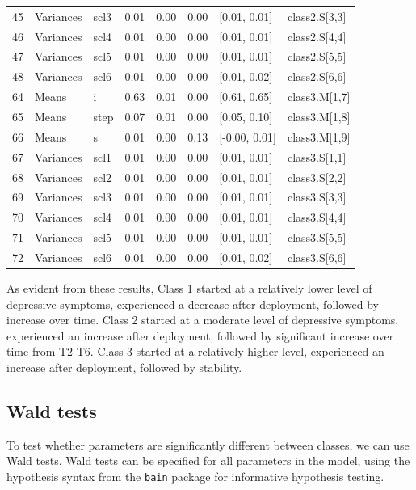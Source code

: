 \documentclass[
  man,floatsintext]{apa6}
\begin{document}
\begin{center}
\begin{ThreePartTable}
\begin{longtable}{llllllll}
45 & Variances & scl3 & 0.01 & 0.00 & 0.00 & {}[0.01, 0.01] & class2.S[3,3]\\
46 & Variances & scl4 & 0.01 & 0.00 & 0.00 & {}[0.01, 0.01] & class2.S[4,4]\\
47 & Variances & scl5 & 0.01 & 0.00 & 0.00 & {}[0.01, 0.01] & class2.S[5,5]\\
48 & Variances & scl6 & 0.01 & 0.00 & 0.00 & {}[0.01, 0.02] & class2.S[6,6]\\
64 & Means & i & 0.63 & 0.01 & 0.00 & {}[0.61, 0.65] & class3.M[1,7]\\
65 & Means & step & 0.07 & 0.01 & 0.00 & {}[0.05, 0.10] & class3.M[1,8]\\
66 & Means & s & 0.01 & 0.00 & 0.13 & {}[-0.00, 0.01] & class3.M[1,9]\\
67 & Variances & scl1 & 0.01 & 0.00 & 0.00 & {}[0.01, 0.01] & class3.S[1,1]\\
68 & Variances & scl2 & 0.01 & 0.00 & 0.00 & {}[0.01, 0.01] & class3.S[2,2]\\
69 & Variances & scl3 & 0.01 & 0.00 & 0.00 & {}[0.01, 0.01] & class3.S[3,3]\\
70 & Variances & scl4 & 0.01 & 0.00 & 0.00 & {}[0.01, 0.01] & class3.S[4,4]\\
71 & Variances & scl5 & 0.01 & 0.00 & 0.00 & {}[0.01, 0.01] & class3.S[5,5]\\
72 & Variances & scl6 & 0.01 & 0.00 & 0.00 & {}[0.01, 0.02] & class3.S[6,6]\\
\bottomrule
\end{longtable}

\end{ThreePartTable}
\end{center}

As evident from these results,
Class 1 started at a relatively lower level of depressive symptoms,
experienced a decrease after deployment,
followed by increase over time.
Class 2 started at a moderate level of depressive symptoms,
experienced an increase after deployment,
followed by significant increase over time from T2-T6.
Class 3 started at a relatively higher level,
experienced an increase after deployment, followed by stability.

\hypertarget{wald-tests}{%
\subsection{Wald tests}\label{wald-tests}}

To test whether parameters are significantly different between classes,
we can use Wald tests.
Wald tests can be specified for all parameters in the model,
using the hypothesis syntax from the \texttt{bain} package for informative hypothesis testing.
\end{document}
